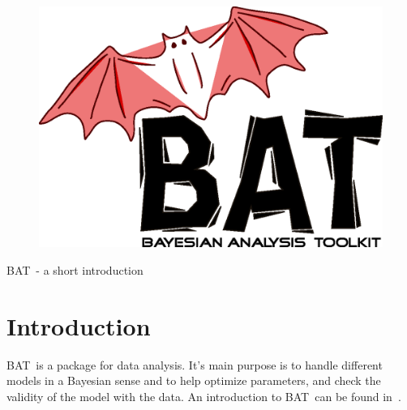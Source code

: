 \documentclass[11pt, a4paper]{article}
\newcommand{\bat}{{\sc BAT}}
\begin{document}

\thispagestyle{empty}

\begin{figure}
\includegraphics[scale=0.25]{bat.eps}
\end{figure}

\vspace{1.0cm}

\begin{center}

{\Large \bat\ - a short introduction}

\end{center}

\thispagestyle{empty}

\pagebreak


\thispagestyle{empty}

\tableofcontents

\pagebreak

\section{Introduction}
\label{section:introduction}

\bat\ is a package for data analysis. It's main purpose is to
handle different models in a Bayesian sense and to help optimize
parameters, and check the validity of the model with the data. An
introduction to \bat\ can be found in~\cite{Caldwell:2008fw}. \\ 
\end{document}
